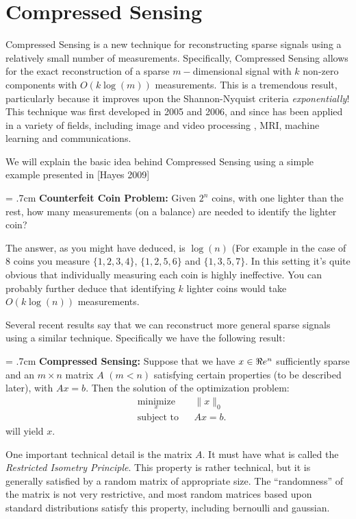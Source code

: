 \section*{Compressed Sensing}


Compressed Sensing is a new technique for reconstructing sparse signals using a relatively small number of measurements. Specifically, Compressed Sensing allows for the exact reconstruction of a sparse $m-$dimensional signal with $k$ non-zero components with $O(k \log (m))$ measurements. This is a tremendous result, particularly because it improves upon the Shannon-Nyquist criteria \emph{exponentially}! This technique was first developed in 2005 and 2006, and since has been applied in a variety of fields, including image and video processing , MRI, machine learning and communications.

We will explain the basic idea behind Compressed Sensing using a simple example presented in [Hayes 2009]


\hangindent = .7cm
\setlength{\parindent}{.7cm}
\textbf{Counterfeit Coin Problem:} Given $2^n$ coins, with one lighter than the rest, how many measurements (on a balance) are needed to identify the lighter coin?
\setlength{\parindent}{0cm}

The answer, as you might have deduced, is $\log(n)$ (For example in the case of 8 coins you measure $\{1,2,3,4\}$, $\{1,2,5,6\}$ and $\{1,3,5,7\}$. In this setting it's quite obvious that individually measuring each coin is highly ineffective. You can probably further deduce that identifying $k$ lighter coins would take $O(k \log(n))$ measurements.

Several recent results say that we can reconstruct more general sparse signals using a similar technique. Specifically we have the following result:

\hangindent = .7cm
\setlength{\parindent}{.7cm}
\textbf{Compressed Sensing:} Suppose that we have $x \in \Re e^n$  sufficiently sparse and an $m \times n$ matrix $A$ $(m < n)$ satisfying certain properties (to be described later), with $Ax = b$. Then the solution of the optimization problem:
\begin{equation*}
\begin{aligned}
& \underset{x}{\text{minimize}}
& & \|x\|_0\\
& \text{subject to}
& & Ax = b.
\end{aligned}
\end{equation*}
 will yield $x$.
\setlength{\parindent}{0cm}

One important technical detail is the matrix $A$.  It must have what is called the \emph{Restricted Isometry Principle}. This property is rather technical, but it is generally satisfied by a random matrix of appropriate size. The ``randomness'' of the matrix is not very restrictive, and most random matrices based upon standard distributions satisfy this property, including bernoulli and gaussian.

